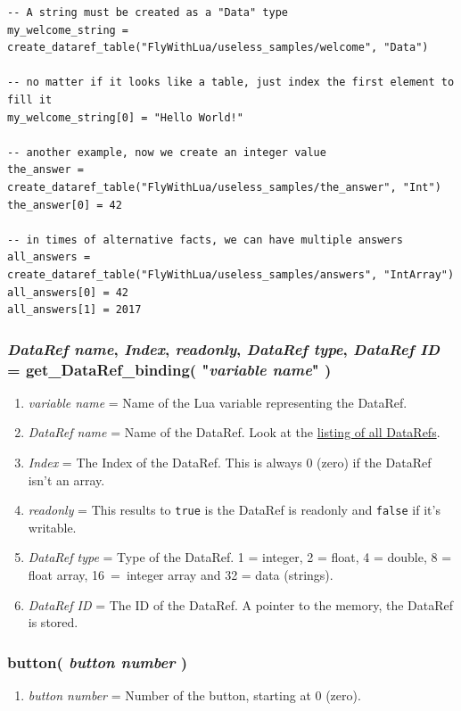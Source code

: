 \documentclass[11pt,parskip=half,a4paper]{scrartcl}
\begin{document}
\begin{lstlisting}
-- A string must be created as a "Data" type
my_welcome_string = create_dataref_table("FlyWithLua/useless_samples/welcome", "Data")

-- no matter if it looks like a table, just index the first element to fill it
my_welcome_string[0] = "Hello World!"

-- another example, now we create an integer value
the_answer = create_dataref_table("FlyWithLua/useless_samples/the_answer", "Int")
the_answer[0] = 42

-- in times of alternative facts, we can have multiple answers
all_answers = create_dataref_table("FlyWithLua/useless_samples/answers", "IntArray")
all_answers[0] = 42
all_answers[1] = 2017
\end{lstlisting}


\subsubsection{\emph{DataRef name}, \emph{Index}, \emph{readonly}, \emph{DataRef type}, \emph{DataRef ID} = get\_DataRef\_binding( "\emph{variable name}" )}

\begin{enumerate}
	\item \emph{variable name} = Name of the Lua variable representing the DataRef.
	\item \emph{DataRef name} = Name of the DataRef. Look at the \href{http://www.xsquawkbox.net/xpsdk/docs/DataRefs.html}{listing of all DataRefs}.
	\item \emph{Index} = The Index of the DataRef. This is always 0 (zero) if the DataRef isn't an array.
	\item \emph{readonly} = This results to \verb|true| is the DataRef is readonly and \verb|false| if it's writable.
	\item \emph{DataRef type} = Type of the DataRef. 1 = integer, 2 = float, 4 = double, 8 = float array, 16~=~integer array and 32 = data (strings).
	\item \emph{DataRef ID} = The ID of the DataRef. A pointer to the memory, the DataRef is stored.
\end{enumerate}


\subsubsection{button( \emph{button number} )}

\begin{enumerate}
	\item \emph{button number} = Number of the button, starting at 0 (zero).
\end{enumerate}
\end{document}
